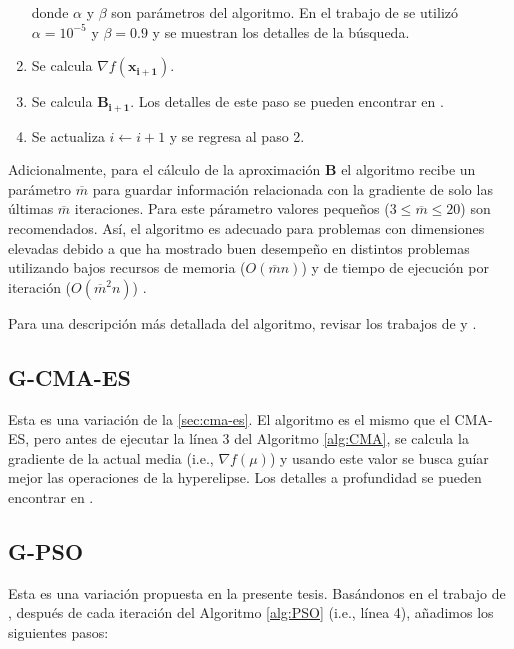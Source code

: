 \begin{enumerate}
      donde $\alpha$ y $\beta$ son parámetros del algoritmo. En el trabajo de \cite{Byrd1995} se
      utilizó $\alpha = 10^{-5}$ y $\beta = 0.9$ y se muestran los detalles de la búsqueda.


\item Se calcula $\nabla f(\boldsymbol{x_{i+1}})$.

\item Se calcula $\boldsymbol{B_{i+1}}$. Los detalles de este paso se pueden encontrar en \cite{Byrd1995}.

\item Se actualiza $i \gets i + 1$ y se regresa al paso 2.

\end{enumerate}


Adicionalmente, para el cálculo de la aproximación $\boldsymbol{B}$ el algoritmo recibe un parámetro
$\overline{m}$ para guardar información relacionada con la gradiente de solo las últimas $\overline{m}$ 
iteraciones. Para este párametro valores pequeños ($3 \leq \overline{m} \leq 20$) son recomendados.
Así, el algoritmo es adecuado para problemas con dimensiones elevadas debido a que
ha mostrado buen desempeño en distintos problemas utilizando bajos recursos de memoria
($O(\overline{m}n)$) y de tiempo de ejecución por iteración ($O(\overline{m}^2n)$) 
\citep{Zhu1997}.

Para una descripción más detallada del algoritmo, revisar los trabajos de \cite{Byrd1995} y \cite{Zhu1997}.

\subsection{G-CMA-ES}\label{sec:g-cma-es}

Esta es una variación de la \autoref{sec:cma-es}. El algoritmo es el mismo que el CMA-ES,
pero antes de ejecutar la línea 3 del Algoritmo \ref{alg:CMA}, se calcula la
gradiente de la actual media (i.e., $\nabla f(\mu)$) y usando este valor se busca guíar
mejor las operaciones de la hyperelipse.
Los detalles a profundidad se pueden encontrar en \cite{Nikolaus2021}.

\subsection{G-PSO}\label{sec:g-pso}

Esta es una variación propuesta en la presente tesis.
Basándonos en el trabajo de \cite{Demidova2020}, después de cada iteración
del Algoritmo \ref{alg:PSO} (i.e., línea 4), añadimos los siguientes pasos:

